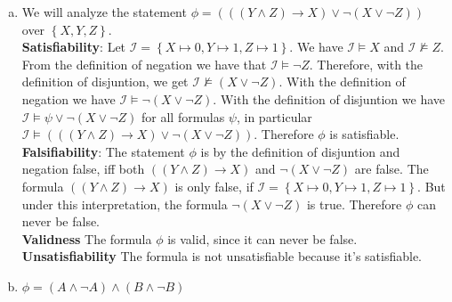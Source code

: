\documentclass{article} %
\begin{document}
\begin{enumerate}[(a)]
	\item We will analyze the statement \( \phi = (((Y \land Z ) \to  X) \lor \lnot (X \lor  \lnot Z)) \)
	      over \( \left\{ X,Y,Z \right\}  \). \\
	      \textbf{Satisfiability}: Let \( \mathcal I = \left\{ X \mapsto 0, Y \mapsto 1, Z \mapsto 1 \right\}  \). We have \( \mathcal I \models X \) and \( \mathcal I \not\models Z \). From the definition of negation we have that \( \mathcal I \models \lnot Z \). Therefore, with the definition of disjuntion, we get \(  \mathcal I \not\models (X \lor \lnot Z ) \). With the definition of negation we have \(  \mathcal I \models \lnot (X \lor \lnot Z )\). With the definition of disjuntion we have \(  \mathcal I \models \psi \lor \lnot (X \lor \lnot Z )  \) for all formulas \( \psi \), in particular \( \mathcal I \models (((Y \land Z ) \to  X) \lor \lnot (X \lor  \lnot Z)) \). Therefore \( \phi \) is satisfiable. \\
	      \textbf{Falsifiability}:  The statement \( \phi \) is by the definition of disjuntion and negation false, iff both \(  ((Y \land Z ) \to  X)\) and \( \lnot(X \lor  \lnot Z) \) are false. The formula \( ((Y \land Z ) \to  X) \) is only false, if \( \mathcal I = \left\{ X \mapsto 0, Y \mapsto 1, Z \mapsto 1 \right\}  \). But under this interpretation, the formula \( \lnot(X \lor  \lnot Z) \) is true. Therefore \( \phi \) can never be false. \\
	      \textbf{Validness} The formula \( \phi \) is valid, since it can never be false. \\
	      \textbf{Unsatisfiability} The formula is not unsatisfiable because it's satisfiable.


	\item \( \phi = (A \land \lnot A) \land (B \land \lnot B) \)
\end{enumerate}
\end{document}

